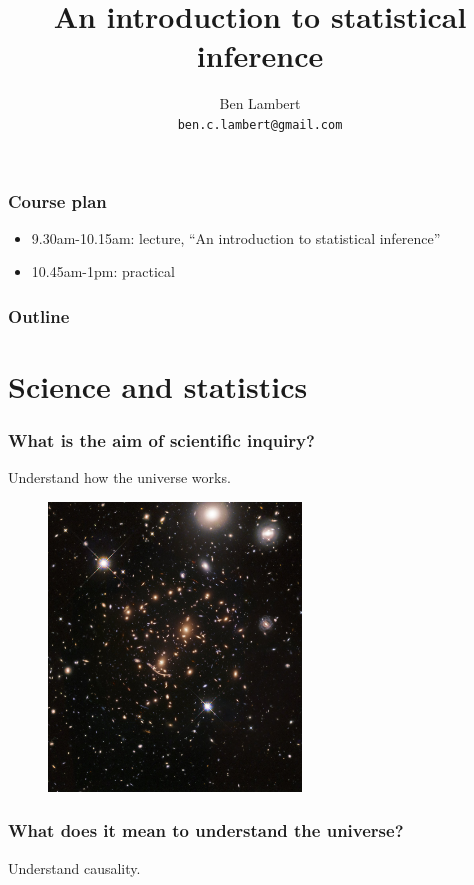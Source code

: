 \documentclass[handout]{beamer}
\title{An introduction to statistical inference}
\author[Ben Lambert]{Ben Lambert\inst{1}\\ \texttt{ben.c.lambert@gmail.com}}
\date{\displaydate{date}}
\institute[University of Oxford]{
\inst{1}University of Oxford}
\begin{document}
\begin{frame}
\titlepage
\end{frame}

\begin{frame}
	\frametitle{Course plan}
	\begin{itemize}
		\item 9.30am-10.15am: lecture, ``An introduction to statistical inference''
		\item 10.45am-1pm: practical
	\end{itemize}
	
\end{frame}

\begin{frame}
	\frametitle{Outline}
	\tableofcontents
\end{frame}

\section{Science and statistics}
\frame{\tableofcontents[currentsection]}

\begin{frame}
	\frametitle{What is the aim of scientific inquiry?}
	Understand how the universe works.
	
		\begin{figure}[ht]
			\centerline{\includegraphics[width=0.6\textwidth]{./figures/universe.jpeg}}
		\end{figure}
	
\end{frame}

\begin{frame}
	\frametitle{What does it mean to understand the universe?}
	
	Understand causality.
	
\end{frame}
\end{document}
